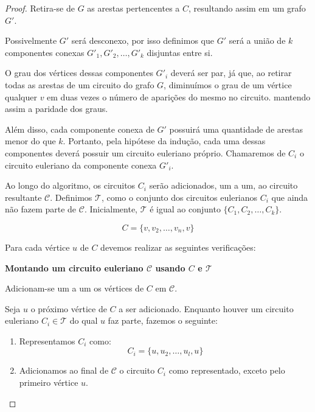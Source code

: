 \begin{proof}
Retira-se de $G$ as arestas pertencentes a $C$, resultando assim em um grafo $G'$. 

Possivelmente $G'$ será desconexo, por isso definimos que $G'$ será a união de $k$ componentes conexas $G'_1, G'_2, \dots, G'_k$ disjuntas entre si.

O grau dos vértices dessas componentes $G'_i$ deverá ser par, já que, ao retirar todas as arestas de um circuito do grafo $G$, diminuímos o grau de um vértice qualquer $v$ em duas vezes o número de aparições do mesmo no circuito. mantendo assim a paridade dos graus. 

Além disso, cada componente conexa de $G'$ possuirá uma quantidade de arestas menor do que $k$.
Portanto, pela hipótese da indução, cada uma dessas componentes deverá possuir um circuito euleriano próprio. 
Chamaremos de $C_i$ o circuito euleriano da componente conexa $G'_i$.

\sloppy Ao longo do algoritmo, os circuitos $C_i$ serão adicionados, um a um, ao circuito resultante $\mathcal{C}$. 
Definimos $\mathcal{T}$, como o conjunto dos circuitos eulerianos $C_i$ que ainda não fazem parte de $\mathcal{C}$. 
Inicialmente, $\mathcal{T}$ é igual ao conjunto $\{C_1, C_2, \dots, C_k\}$.


\[
	C = \{v, v_2, \dots, v_n, v\}
\]

Para cada vértice $u$ de $C$ devemos realizar as seguintes verificações:

\begin{tcolorbox}

    \begin{center}
        \textbf{Montando um circuito euleriano $\mathcal{C}$ usando $C$ e $\mathcal{T}$}
    \end{center}

    Adicionam-se um a um os vértices de $C$ em $\mathcal{C}$.

    Seja $u$ o próximo vértice de $C$ a ser adicionado.
    Enquanto houver um circuito euleriano $C_i \in \mathcal{T}$ do qual $u$ faz parte, fazemos o seguinte:


    \begin{enumerate}
        \item Representamos $C_i$ como: 
            \[
                C_i = \{u, u_2, \dots, u_l, u\}
            \]

        \item Adicionamos ao final de $\mathcal{C}$ o circuito $C_i$ como representado, exceto pelo primeiro vértice $u$. 


\end{enumerate}
\end{tcolorbox}
\end{proof}
